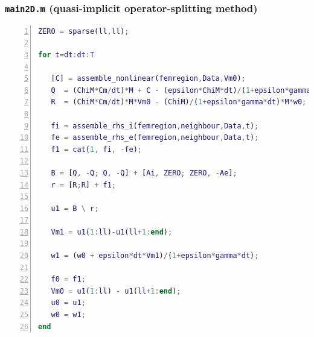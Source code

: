 \documentclass[a4paper,11pt]{article}
\begin{document}
\subsubsection{\texttt{main2D.m} (quasi-implicit operator-splitting method)}\label{OS}
\begin{lstlisting}[language=Matlab,basicstyle=\small, numbers=left, numberstyle=\tiny,  name = main2D.m (quasi-implicit operator-splitting), frame=single]
ZERO = sparse(ll,ll);
        
for t=dt:dt:T
        
   [C] = assemble_nonlinear(femregion,Data,Vm0);
   Q  = (ChiM*Cm/dt)*M + C - (epsilon*ChiM*dt)/(1+epsilon*gamma*dt)*M;
   R  = (ChiM*Cm/dt)*M*Vm0 - (ChiM)/(1+epsilon*gamma*dt)*M*w0;
    
   fi = assemble_rhs_i(femregion,neighbour,Data,t);
   fe = assemble_rhs_e(femregion,neighbour,Data,t);
   f1 = cat(1, fi, -fe);
    
   B = [Q, -Q; Q, -Q] + [Ai, ZERO; ZERO, -Ae];
   r = [R;R] + f1;
        
   u1 = B \ r; 
        
   Vm1 = u1(1:ll)-u1(ll+1:end);

   w1 = (w0 + epsilon*dt*Vm1)/(1+epsilon*gamma*dt);
    
   f0 = f1;
   Vm0 = u1(1:ll) - u1(ll+1:end);
   u0 = u1;
   w0 = w1;
end
\end{lstlisting}
\end{document}
